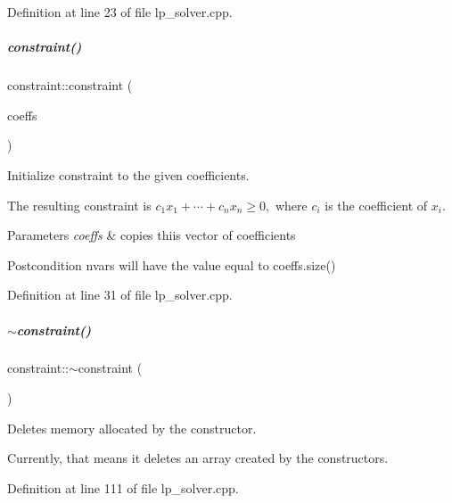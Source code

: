 Definition at line 23 of file lp\+\_\+solver.\+cpp.

\mbox{\label{group___c_l_s_solvers_abcf2ec568e0dcfd37c2dc150b738ad2d}} 
\subparagraph{\texorpdfstring{constraint()}{constraint()}\hspace{0.1cm}{\footnotesize\ttfamily [2/2]}}
{\footnotesize\ttfamily constraint\+::constraint (\begin{DoxyParamCaption}\item[{vector$<$ C\+O\+N\+S\+T\+R\+\_\+\+T\+Y\+PE $>$ \&}]{coeffs }\end{DoxyParamCaption})}



Initialize constraint to the given coefficients. 

The resulting constraint is $ c_1x_1 + \cdots + c_nx_n \geq 0, $ where $ c_i $ is the coefficient of $ x_i $. 
\begin{DoxyParams}{Parameters}
{\em coeffs} & copies thiis vector of coefficients \\
\hline
\end{DoxyParams}
\begin{DoxyPostcond}{Postcondition}
{\ttfamily nvars} will have the value equal to {\ttfamily coeffs.\+size()} 
\end{DoxyPostcond}


Definition at line 31 of file lp\+\_\+solver.\+cpp.

\mbox{\label{group___c_l_s_solvers_a02e58b1ce0b271e3daac2da841152582}} 
\subparagraph{\texorpdfstring{$\sim$constraint()}{~constraint()}}
{\footnotesize\ttfamily constraint\+::$\sim$constraint (\begin{DoxyParamCaption}{ }\end{DoxyParamCaption})}



Deletes memory allocated by the constructor. 

Currently, that means it deletes an array created by the constructors. 

Definition at line 111 of file lp\+\_\+solver.\+cpp.



